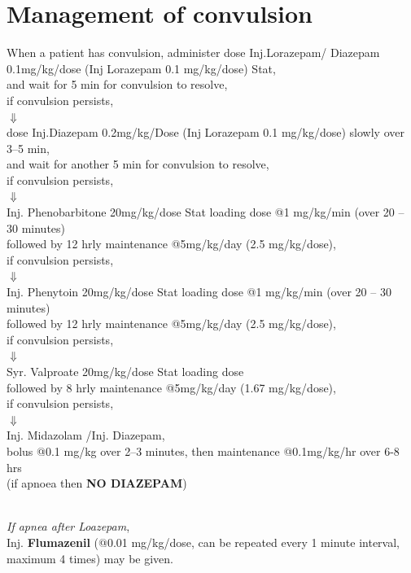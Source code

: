 \documentclass[11pt,a4paper]{report}
\begin{document}
\section{Management of convulsion}
When a patient has convulsion, administer  dose Inj.Lorazepam/ Diazepam 0.1mg/kg/dose (Inj Lorazepam 0.1 mg/kg/dose) Stat, \\ 
and wait for 5 min for convulsion to resolve, \\
if convulsion persists, \\		
$\Downarrow$ \\		
 dose Inj.Diazepam 0.2mg/kg/Dose (Inj Lorazepam 0.1 mg/kg/dose) slowly over 3--5 min, \\
and wait for another 5 min for convulsion to resolve, \\
if convulsion persists,  \\		
$\Downarrow$ \\		
Inj. Phenobarbitone 20mg/kg/dose Stat loading dose @1 mg/kg/min (over 20 -- 30 minutes) \\
followed by 12 hrly maintenance @5mg/kg/day (2.5 mg/kg/dose), \\
if convulsion persists,  \\		
$\Downarrow$ \\		
Inj. Phenytoin 20mg/kg/dose Stat loading dose @1 mg/kg/min (over 20 -- 30 minutes) \\
followed by 12 hrly maintenance @5mg/kg/day (2.5 mg/kg/dose), \\
if convulsion persists,  \\		
$\Downarrow$ \\		
Syr. Valproate 20mg/kg/dose Stat loading dose \\ followed by 8 hrly maintenance @5mg/kg/day (1.67 mg/kg/dose), \\
if convulsion persists, \\
$\Downarrow$ \\		
Inj. Midazolam /Inj. Diazepam, \\
bolus @0.1 mg/kg over 2--3 minutes, then maintenance @0.1mg/kg/hr over 6-8 hrs\\ (if apnoea then \textbf{NO DIAZEPAM}) 

~\\
\noindent {\color{red}\textbf{$\star\star\star$}} \textit{If apnea after Loazepam}, \\
Inj. \textbf{Flumazenil} (@0.01 mg/kg/dose, can be repeated every 1 minute interval, maximum 4 times) may be given. \cite{appletan1995lorazepam}
\end{document}
